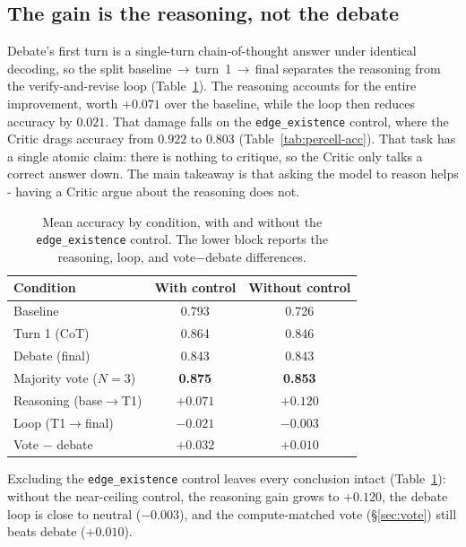 \documentclass[11pt]{article}
\begin{document}
\subsection{The gain is the reasoning, not the debate}
\label{sec:decomp}
Debate's first turn is a single-turn chain-of-thought answer under identical
decoding, so the split baseline\,$\rightarrow$\,turn~1\,$\rightarrow$\,final
separates the reasoning from the verify-and-revise loop
(Table~\ref{tab:main}). The reasoning accounts for the entire improvement, worth
$+0.071$ over the baseline, while the loop then reduces accuracy by $0.021$. That
damage falls on the \texttt{edge\_existence} control, where the Critic drags accuracy
from $0.922$ to $0.803$ (Table~\ref{tab:percell-acc}). That task has a single atomic claim: there is nothing to critique, so the
Critic only talks a correct answer down. The main takeaway is that asking
the model to reason helps - having a Critic argue about the reasoning does not.

\begin{table}[h!]
  \centering
  \small
  \begin{tabular}{@{}lcc@{}}
    \toprule
    \textbf{Condition} & \textbf{With control} & \textbf{Without control} \\
    \midrule
    Baseline                & 0.793 & 0.726 \\
    Turn 1 (CoT)            & 0.864 & 0.846 \\
    Debate (final)          & 0.843 & 0.843 \\
    Majority vote ($N{=}3$)  & \textbf{0.875} & \textbf{0.853} \\
    \midrule
    Reasoning (base$\to$T1) & $+0.071$ & $+0.120$ \\
    Loop (T1$\to$final)     & $-0.021$ & $-0.003$ \\
    Vote $-$ debate         & $+0.032$ & $+0.010$ \\
    \bottomrule
  \end{tabular}
  \caption{Mean accuracy by condition, with and without the \texttt{edge\_existence}
  control. The lower block reports the reasoning, loop, and vote$-$debate
  differences.}
  \label{tab:main}
\end{table}

Excluding the \texttt{edge\_existence} control leaves every conclusion intact
(Table~\ref{tab:main}): without the near-ceiling control, the reasoning gain grows to
$+0.120$, the debate loop is close to neutral ($-0.003$), and the compute-matched vote
(\S\ref{sec:vote}) still beats debate ($+0.010$).
\end{document}
